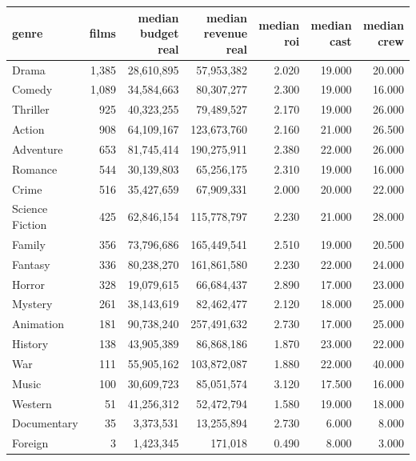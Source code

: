 \begin{tabular}{lrrrrrr}
\toprule
genre & films & median budget real & median revenue real & median roi & median cast & median crew \\
\midrule
Drama & 1,385 & 28,610,895 & 57,953,382 & 2.020 & 19.000 & 20.000 \\
Comedy & 1,089 & 34,584,663 & 80,307,277 & 2.300 & 19.000 & 16.000 \\
Thriller & 925 & 40,323,255 & 79,489,527 & 2.170 & 19.000 & 26.000 \\
Action & 908 & 64,109,167 & 123,673,760 & 2.160 & 21.000 & 26.500 \\
Adventure & 653 & 81,745,414 & 190,275,911 & 2.380 & 22.000 & 26.000 \\
Romance & 544 & 30,139,803 & 65,256,175 & 2.310 & 19.000 & 16.000 \\
Crime & 516 & 35,427,659 & 67,909,331 & 2.000 & 20.000 & 22.000 \\
Science Fiction & 425 & 62,846,154 & 115,778,797 & 2.230 & 21.000 & 28.000 \\
Family & 356 & 73,796,686 & 165,449,541 & 2.510 & 19.000 & 20.500 \\
Fantasy & 336 & 80,238,270 & 161,861,580 & 2.230 & 22.000 & 24.000 \\
Horror & 328 & 19,079,615 & 66,684,437 & 2.890 & 17.000 & 23.000 \\
Mystery & 261 & 38,143,619 & 82,462,477 & 2.120 & 18.000 & 25.000 \\
Animation & 181 & 90,738,240 & 257,491,632 & 2.730 & 17.000 & 25.000 \\
History & 138 & 43,905,389 & 86,868,186 & 1.870 & 23.000 & 22.000 \\
War & 111 & 55,905,162 & 103,872,087 & 1.880 & 22.000 & 40.000 \\
Music & 100 & 30,609,723 & 85,051,574 & 3.120 & 17.500 & 16.000 \\
Western & 51 & 41,256,312 & 52,472,794 & 1.580 & 19.000 & 18.000 \\
Documentary & 35 & 3,373,531 & 13,255,894 & 2.730 & 6.000 & 8.000 \\
Foreign & 3 & 1,423,345 & 171,018 & 0.490 & 8.000 & 3.000 \\
\bottomrule
\end{tabular}